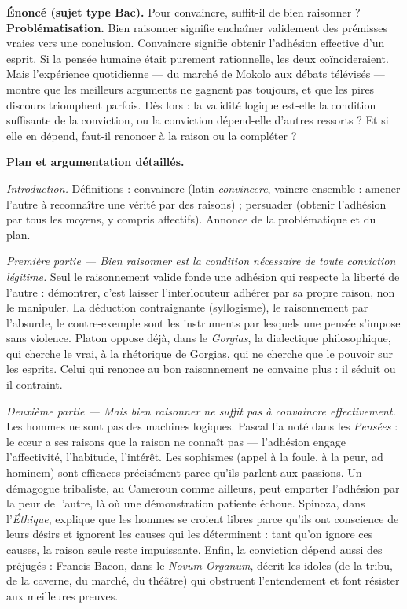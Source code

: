 \documentclass[11pt]{article}
\begin{document}
\begin{exoresolu}
\textbf{Énoncé (sujet type Bac).} Pour convaincre, suffit-il de bien raisonner ?
\tcblower
\textbf{Problématisation.} \guillemotleft Bien raisonner \guillemotright signifie enchaîner validement des prémisses vraies vers une conclusion. \guillemotleft Convaincre \guillemotright signifie obtenir l'adhésion effective d'un esprit. Si la pensée humaine était purement rationnelle, les deux coïncideraient. Mais l'expérience quotidienne — du marché de Mokolo aux débats télévisés — montre que les meilleurs arguments ne gagnent pas toujours, et que les pires discours triomphent parfois. Dès lors : la validité logique est-elle la condition suffisante de la conviction, ou la conviction dépend-elle d'autres ressorts ? Et si elle en dépend, faut-il renoncer à la raison ou la compléter ?

\textbf{Plan et argumentation détaillés.}

\emph{Introduction.} Définitions : convaincre (latin \emph{convincere}, \guillemotleft vaincre ensemble \guillemotright : amener l'autre à reconnaître une vérité par des raisons) ; persuader (obtenir l'adhésion par tous les moyens, y compris affectifs). Annonce de la problématique et du plan.

\emph{Première partie — Bien raisonner est la condition nécessaire de toute conviction légitime.} Seul le raisonnement valide fonde une adhésion qui respecte la liberté de l'autre : démontrer, c'est laisser l'interlocuteur adhérer par sa propre raison, non le manipuler. La déduction contraignante (syllogisme), le raisonnement par l'absurde, le contre-exemple sont les instruments par lesquels une pensée s'impose sans violence. Platon oppose déjà, dans le \emph{Gorgias}, la dialectique philosophique, qui cherche le vrai, à la rhétorique de Gorgias, qui ne cherche que le pouvoir sur les esprits. Celui qui renonce au bon raisonnement ne convainc plus : il séduit ou il contraint.

\emph{Deuxième partie — Mais bien raisonner ne suffit pas à convaincre effectivement.} Les hommes ne sont pas des machines logiques. Pascal l'a noté dans les \emph{Pensées} : le cœur a ses raisons que la raison ne connaît pas — l'adhésion engage l'affectivité, l'habitude, l'intérêt. Les sophismes (appel à la foule, à la peur, ad hominem) sont efficaces précisément parce qu'ils parlent aux passions. Un démagogue tribaliste, au Cameroun comme ailleurs, peut emporter l'adhésion par la peur de l'autre, là où une démonstration patiente échoue. Spinoza, dans l'\emph{Éthique}, explique que les hommes se croient libres parce qu'ils ont conscience de leurs désirs et ignorent les causes qui les déterminent : tant qu'on ignore ces causes, la raison seule reste impuissante. Enfin, la conviction dépend aussi des préjugés : Francis Bacon, dans le \emph{Novum Organum}, décrit les \guillemotleft idoles \guillemotright (de la tribu, de la caverne, du marché, du théâtre) qui obstruent l'entendement et font résister aux meilleures preuves.


\end{exoresolu}
\end{document}
